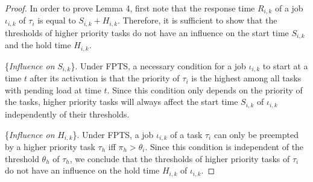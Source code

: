 \documentclass[fleqn]{article}
\begin{document}
\begin{proof}
	In order to prove Lemma 4, first note that the response time $R_{i,k}$ of a job $\iota_{i,k}$ of $\tau_i$ is equal to $S_{i,k}+H_{i,k}$. Therefore, it is sufficient to show that the thresholds of higher priority tasks do not have an influence on the start time $S_{i,k}$ and the hold time $H_{i,k}$.
	
	\{\textit{Influence on} $S_{i,k}$\}. Under FPTS, a necessary condition for a job $\iota_{i,k}$ to start at a time $t$ after its activation is that the priority of $\tau_i$ is the highest among all tasks with pending load at time $t$. Since this condition only depends on the priority of the tasks, higher priority tasks will always affect the start time $S_{i,k}$ of $\iota_{i,k}$ independently of their thresholds.
	
	\{\textit{Influence on} $H_{i,k}$\}. Under FPTS, a job $\iota_{i,k}$ of a task $\tau_i$ can only be preempted by a higher priority task $\tau_h$ iff $\pi_h > \theta_i$. Since this condition is independent of the threshold $\theta_h$ of $\tau_h$, we conclude that the thresholds of higher priority tasks of $\tau_i$ do not have an influence on the hold time $H_{i,k}$ of $\iota_{i,k}$.
\end{proof}
\end{document}
